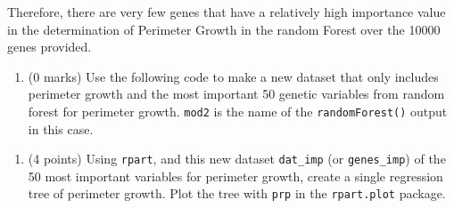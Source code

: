 \documentclass[
]{article}
\newenvironment{Shaded}{\begin{snugshade}}{\end{snugshade}}
\newcommand{\AttributeTok}[1]{\textcolor[rgb]{0.13,0.29,0.53}{#1}}
\newcommand{\CommentTok}[1]{\textcolor[rgb]{0.56,0.35,0.01}{\textit{#1}}}
\newcommand{\DecValTok}[1]{\textcolor[rgb]{0.00,0.00,0.81}{#1}}
\newcommand{\FunctionTok}[1]{\textcolor[rgb]{0.13,0.29,0.53}{\textbf{#1}}}
\newcommand{\NormalTok}[1]{#1}
\newcommand{\OtherTok}[1]{\textcolor[rgb]{0.56,0.35,0.01}{#1}}
\newcommand{\SpecialCharTok}[1]{\textcolor[rgb]{0.81,0.36,0.00}{\textbf{#1}}}
\newcommand{\StringTok}[1]{\textcolor[rgb]{0.31,0.60,0.02}{#1}}
\providecommand{\tightlist}{%
  \setlength{\itemsep}{0pt}\setlength{\parskip}{0pt}}
\begin{document}
Therefore, there are very few genes that have a relatively high
importance value in the determination of Perimeter Growth in the random
Forest over the 10000 genes provided. \newpage

\begin{enumerate}
\def\labelenumi{\arabic{enumi}.}
\setcounter{enumi}{2}
\tightlist
\item
  (0 marks) Use the following code to make a new dataset that only
  includes perimeter growth and the most important 50 genetic variables
  from random forest for perimeter growth. \texttt{mod2} is the name of
  the \texttt{randomForest()} output in this case.
\end{enumerate}

\begin{Shaded}
\end{Shaded}

\newpage

\begin{enumerate}
\def\labelenumi{\arabic{enumi}.}
\setcounter{enumi}{3}
\tightlist
\item
  (4 points) Using \texttt{rpart}, and this new dataset
  \texttt{dat\_imp} (or \texttt{genes\_imp}) of the 50 most important
  variables for perimeter growth, create a single regression tree of
  perimeter growth. Plot the tree with \texttt{prp} in the
  \texttt{rpart.plot} package.
\end{enumerate}

\begin{Shaded}
\end{Shaded}
\end{document}
